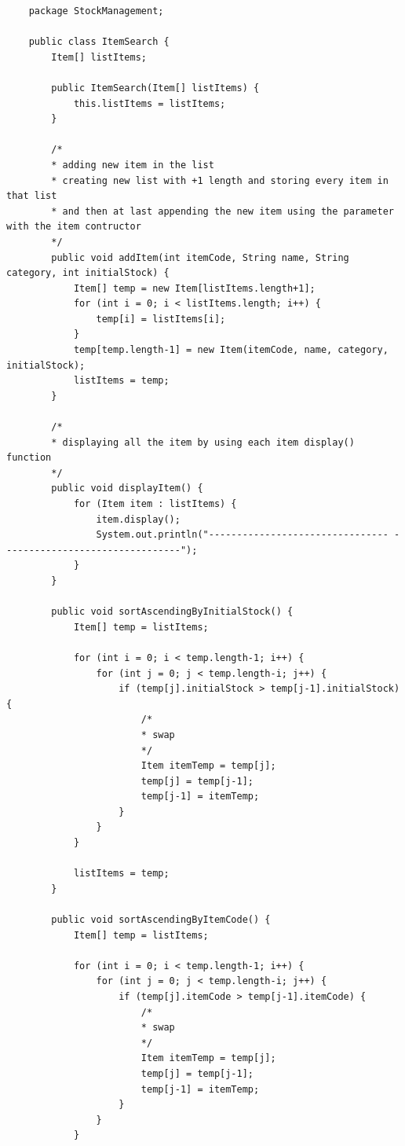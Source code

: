 \documentclass[12pt,titlepage]{article}
\begin{document}
\begin{verbatim}
    package StockManagement;

    public class ItemSearch {
        Item[] listItems;

        public ItemSearch(Item[] listItems) {
            this.listItems = listItems;
        }

        /*
        * adding new item in the list
        * creating new list with +1 length and storing every item in that list
        * and then at last appending the new item using the parameter with the item contructor
        */
        public void addItem(int itemCode, String name, String category, int initialStock) {
            Item[] temp = new Item[listItems.length+1];
            for (int i = 0; i < listItems.length; i++) {
                temp[i] = listItems[i];
            }
            temp[temp.length-1] = new Item(itemCode, name, category, initialStock);
            listItems = temp;
        }

        /*
        * displaying all the item by using each item display() function
        */
        public void displayItem() {
            for (Item item : listItems) {
                item.display();
                System.out.println("-------------------------------- --------------------------------");
            }
        }

        public void sortAscendingByInitialStock() {
            Item[] temp = listItems;
            
            for (int i = 0; i < temp.length-1; i++) {
                for (int j = 0; j < temp.length-i; j++) {
                    if (temp[j].initialStock > temp[j-1].initialStock) {
                        /*
                        * swap
                        */
                        Item itemTemp = temp[j];
                        temp[j] = temp[j-1];
                        temp[j-1] = itemTemp;
                    }
                }
            }

            listItems = temp;
        }
        
        public void sortAscendingByItemCode() {
            Item[] temp = listItems;
            
            for (int i = 0; i < temp.length-1; i++) {
                for (int j = 0; j < temp.length-i; j++) {
                    if (temp[j].itemCode > temp[j-1].itemCode) {
                        /*
                        * swap
                        */
                        Item itemTemp = temp[j];
                        temp[j] = temp[j-1];
                        temp[j-1] = itemTemp;
                    }
                }
            }


\end{verbatim}
\end{document}
